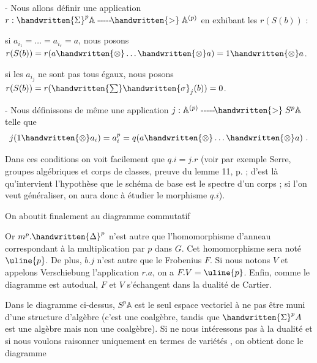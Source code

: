 \noindent - Nous allons définir une application $r:\handwritten{\Sigma}^{p}\mathbb{A}\mathrel{\text{-{}-{}-{}-{}-}\!\handwritten{>}}\mathbb{A}^{(p)}$ en exhibant les $r(S(b))$ :

si $a_{i_1}=\ldots=a_{i_r}=a$, nous posons $r(S(b))=r(a\handwritten{\otimes}\ldots\handwritten{\otimes}a)=1\handwritten{\otimes}a$.

si les $a_{i_j}$ ne sont pas tous égaux, nous posons $r(S(b))=r(\handwritten{\sum}\handwritten{\sigma}_j(b))=0$.

\noindent - Nous définissons de même une application $j:\mathbb{A}^{(p)}\mathrel{\text{-{}-{}-{}-{}-}\!\handwritten{>}}S^p\mathbb{A}$ telle que
\[
j(1\handwritten{\otimes}a_i)=a_i^p=q(a\handwritten{\otimes}\ldots\handwritten{\otimes}a)\ .
\]


Dans ces conditions on voit facilement que $q.i=j.r$ (voir par exemple Serre, groupes algébriques et corps de classes, preuve du lemme 11, p. ; d'est là qu'intervient l'hypothèse que le schéma de base est le spectre d'un corps ; si l'on veut généraliser, on aura donc à étudier le morphisme $q.i$).

On aboutit finalement au diagramme commutatif

Or $m^p.\handwritten{\Delta}^{p}$ n'est autre que l'homomorphisme d'anneau correspondant à la multiplication par $p$ dans $G$. Cet homomorphisme sera noté $\uline{p}$. De plus, $b.j$ n'est autre que le Frobenius $F$. Si nous notons $V$ et appelons Verschiebung l'application $r.a$, on a $F.V=\uline{p}$. Enfin, comme le diagramme est autodual, $F$ et $V$ s'échangent dans la dualité de Cartier.

Dans le diagramme ci-dessus, $S^p\mathbb{A}$ est le seul espace vectoriel à ne pas être muni d'une structure d'algèbre (c'est une coalgèbre, tandis que $\handwritten{\Sigma}^{p}A$ est une algèbre mais non une coalgèbre). Si  ne nous intéressons pas à la dualité et si nous voulons raisonner uniquement en termes de variétés , on obtient donc le diagramme

